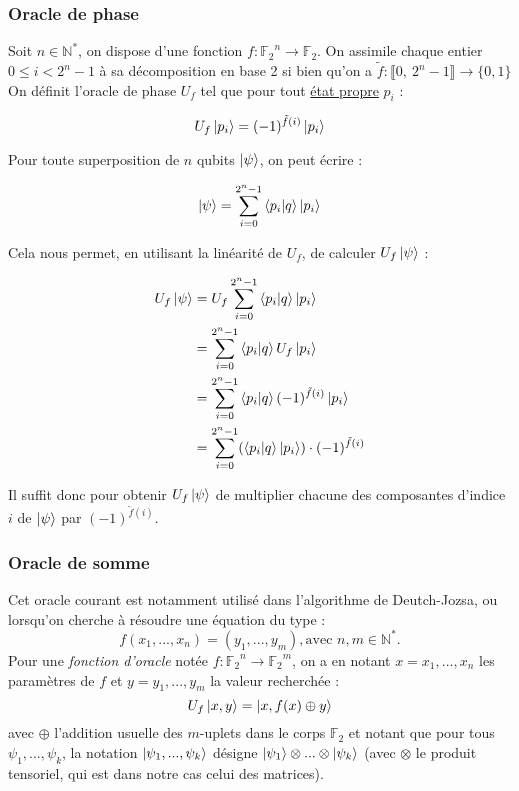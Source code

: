 \documentclass[french]{article}
\newcommand{\somme}{\displaystyle\sum}
\newcommand{\entiers}[2]{\llbracket #1,\ #2\rrbracket} %
\begin{document}
\subsubsection{Oracle de phase}


Soit $n \in \mathbb{N}^*$, on dispose d'une fonction $f : {\mathbb{F}_2}^n \rightarrow \mathbb{F}_2$. On assimile chaque entier $0 \le i < 2^n - 1$ à sa décomposition en base 2 si bien qu'on a $\tilde{f} : \entiers{0}{2^n - 1} \rightarrow \{0, 1\}$ On définit l'oracle de phase $U_f$ tel que pour tout \underline{état propre} $p_i$ :

$$U_f \ket{p_i} = (-1)^{\tilde{f}(i)} \ket{p_i}$$

Pour toute superposition de $n$ qubits $\ket \psi$, on peut écrire :

$$\ket \psi = \somme^{2^n-1}_{i = 0} \bra{p_i}\ket{q} \ket{p_i}$$

Cela nous permet, en utilisant la linéarité de $U_f$, de calculer $U_f \ket \psi$ :

\begin{align*}
U_f \ket \psi &= U_f \somme^{2^n-1}_{i = 0} \bra{p_i}\ket{q} \ket{p_i} \\
              &= \somme^{2^n-1}_{i = 0} \bra{p_i}\ket{q} U_f \ket{p_i} \\
              &= \somme^{2^n-1}_{i = 0} \bra{p_i}\ket{q} (-1)^{\tilde{f}(i)} \ket{p_i} \\
              &= \somme^{2^n-1}_{i = 0} (\bra{p_i}\ket{q} \ket{p_i}) \cdot (-1)^{\tilde{f}(i)}
\end{align*}

Il suffit donc pour obtenir $U_f \ket \psi$ de multiplier chacune des composantes d'indice $i$ de $\ket \psi$ par $(-1)^{\tilde{f}(i)}$.


\subsubsection{Oracle de somme}


Cet oracle courant est notamment utilisé dans l'algorithme de Deutch-Jozsa, ou lorsqu'on cherche à résoudre une équation du type :
$$f(x_1, ..., x_n) = (y_1, ..., y_m), \text{avec } n, m \in \mathbb{N}^*.$$
Pour une \textit{fonction d'oracle} notée $f : {\mathbb{F}_2} ^ n \rightarrow {\mathbb{F}_2} ^ m$, on a en notant $x = x_1, ..., x_n$ les paramètres de $f$ et $y = y_1, ..., y_m$ la valeur recherchée :
$$U_f \ket{x, y} = \ket{x, f(x) \oplus y}$$
avec $\oplus$ l'addition usuelle des $m$-uplets dans le corps $\mathbb{F}_2$ et notant que pour tous $\psi_1, ..., \psi_k$, la notation $\ket{\psi_1, ..., \psi_k}$ désigne $\ket{\psi_1} \otimes ... \otimes \ket{\psi_k}$ (avec $\otimes$ le produit tensoriel, qui est dans notre cas celui des matrices).
\end{document}
